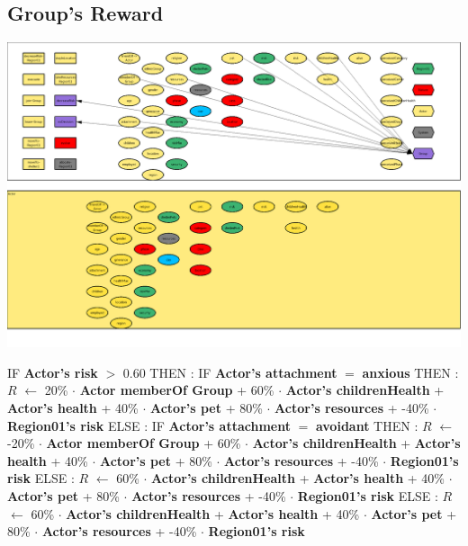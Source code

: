 \documentclass{article}%
\begin{document}
%
\subsection{Group's Reward}%
\label{subsec:Group's Reward}%
\includegraphics[width=\textwidth]{images/Group.png}%
\begin{flushleft}%
IF %
\textbf{Actor's risk}%
$>$%
0.60%
\linebreak%
\hspace*{2em}%
THEN %
: %
IF %
\textbf{Actor's attachment}%
$=$%
\textbf{anxious}%
\linebreak%
\hspace*{4em}%
THEN %
: %
$R$%
$\leftarrow$%
20\%%
$\cdot$%
\textbf{Actor memberOf Group}%
+%
60\%%
$\cdot$%
\textbf{Actor's childrenHealth}%
+%
\textbf{Actor's health}%
+%
40\%%
$\cdot$%
\textbf{Actor's pet}%
+%
80\%%
$\cdot$%
\textbf{Actor's resources}%
+%
{-}40\%%
$\cdot$%
\textbf{Region01's risk}%
\linebreak%
\hspace*{4em}%
ELSE %
: %
IF %
\textbf{Actor's attachment}%
$=$%
\textbf{avoidant}%
\linebreak%
\hspace*{6em}%
THEN %
: %
$R$%
$\leftarrow$%
{-}20\%%
$\cdot$%
\textbf{Actor memberOf Group}%
+%
60\%%
$\cdot$%
\textbf{Actor's childrenHealth}%
+%
\textbf{Actor's health}%
+%
40\%%
$\cdot$%
\textbf{Actor's pet}%
+%
80\%%
$\cdot$%
\textbf{Actor's resources}%
+%
{-}40\%%
$\cdot$%
\textbf{Region01's risk}%
\linebreak%
\hspace*{6em}%
ELSE %
: %
$R$%
$\leftarrow$%
60\%%
$\cdot$%
\textbf{Actor's childrenHealth}%
+%
\textbf{Actor's health}%
+%
40\%%
$\cdot$%
\textbf{Actor's pet}%
+%
80\%%
$\cdot$%
\textbf{Actor's resources}%
+%
{-}40\%%
$\cdot$%
\textbf{Region01's risk}%
\linebreak%
\hspace*{2em}%
ELSE %
: %
$R$%
$\leftarrow$%
60\%%
$\cdot$%
\textbf{Actor's childrenHealth}%
+%
\textbf{Actor's health}%
+%
40\%%
$\cdot$%
\textbf{Actor's pet}%
+%
80\%%
$\cdot$%
\textbf{Actor's resources}%
+%
{-}40\%%
$\cdot$%
\textbf{Region01's risk}%
\end{flushleft}

%
\end{document}
